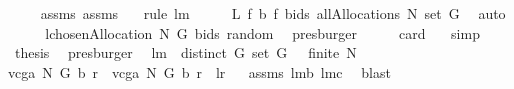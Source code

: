 \begin{isabellebody}
\ \ \isamarkupfalse%
\ {}\ assms{\isacharparenleft}{}{\isacharparenright}\ assms{\isacharparenleft}{}{\isacharparenright}\ {}\ \isamarkupfalse%
\ {\isacharparenleft}rule\ lm{}{}{\isacharparenright}\isanewline
\ \ \isamarkupfalse%
\ \isamarkupfalse%
\ {\isachardoublequoteopen}{\isacharquery}L{\isacharequal}\ {\isacharquery}f\ {\isacharquery}b{\isacharprime}\ {\isacharparenleft}{\isacharquery}f\ bids\ {\isacharparenleft}allAllocations\ {\isacharquery}N\ {\isacharparenleft}set\ G{\isacharparenright}{\isacharparenright}{\isacharparenright}{\isachardoublequoteclose}\ \isamarkupfalse%
\ auto\isanewline
\ \ \isamarkupfalse%
\ \isamarkupfalse%
\ {\isachardoublequoteopen}{\isacharquery}l{\isacharequal}{\isacharbraceleft}chosenAllocation{\isacharprime}\ {\isacharquery}N\ G\ bids\ random{\isacharbraceright}{\isachardoublequoteclose}\ \isamarkupfalse%
\ presburger\isanewline
\ \ \isamarkupfalse%
\ \isamarkupfalse%
\ {\isachardoublequoteopen}card\ {\isachardot}{\isachardot}{\isachardot}{\isacharequal}{}{\isachardoublequoteclose}\ \isamarkupfalse%
\ simp\ \isamarkupfalse%
\ \isamarkupfalse%
\ {\isacharquery}thesis\ \isamarkupfalse%
\ presburger\ \isanewline
{}\isamarkupfalse%
%
\endisatagproof
{\isafoldproof}%
%
\isadelimproof
\isanewline
%
\endisadelimproof
\isanewline
{}\isamarkupfalse%
\ lm{}{}{}{\isacharcolon}\ \ {\isachardoublequoteopen}distinct\ G{\isachardoublequoteclose}\ {\isachardoublequoteopen}set\ G\ {\isasymnoteq}\ {\isacharbraceleft}{\isacharbraceright}{\isachardoublequoteclose}\ {\isachardoublequoteopen}finite\ N{\isachardoublequoteclose}\ \isanewline
{\isachardoublequoteopen}vcga\ N\ G\ b\ r\ {\isacharequal}\ vcga{\isacharprime}\ N\ G\ b\ r{\isachardoublequoteclose}\ {\isacharparenleft}\ {\isachardoublequoteopen}{\isacharquery}l{\isacharequal}{\isacharquery}r{\isachardoublequoteclose}{\isacharparenright}%
\isadelimproof
\ %
\endisadelimproof
%
\isatagproof
{}\isamarkupfalse%
\ assms\ lm{}{}{}b\ lm{}{}c\ \isamarkupfalse%
\ blast%
\endisatagproof
{\isafoldproof}%
%
\isadelimproof
%
\endisadelimproof
\isanewline
\isanewline

\end{isabellebody}
